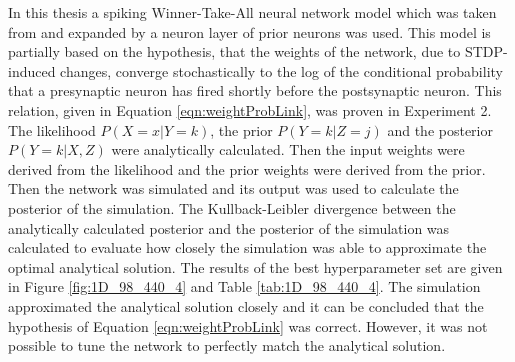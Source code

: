 In this thesis a spiking Winner-Take-All neural network model which was taken from \citet{nessler} and expanded by a neuron layer of prior neurons was used. This model is partially based on the hypothesis, that the weights of the network, due to STDP-induced changes, converge stochastically to the log of the conditional probability that a presynaptic neuron has fired shortly before the postsynaptic neuron. This relation, given in Equation \ref{eqn:weightProbLink}, was proven in Experiment 2. The likelihood $P(X=x|Y=k)$, the prior $P(Y=k|Z=j)$ and the posterior $P(Y = k|X, Z)$ were analytically calculated. Then the input weights were derived from the likelihood and the prior weights were derived from the prior. Then the network was simulated and its output was used to calculate the posterior of the simulation. The Kullback-Leibler divergence between the analytically calculated posterior and the posterior of the simulation was calculated to evaluate how closely the simulation was able to approximate the optimal analytical solution. The results of the best hyperparameter set are given in Figure \ref{fig:1D_98_440_4} and Table \ref{tab:1D_98_440_4}. The simulation approximated the analytical solution closely and it can be concluded that the hypothesis of Equation \ref{eqn:weightProbLink} was correct. However, it was not possible to tune the network to perfectly match the analytical solution.









